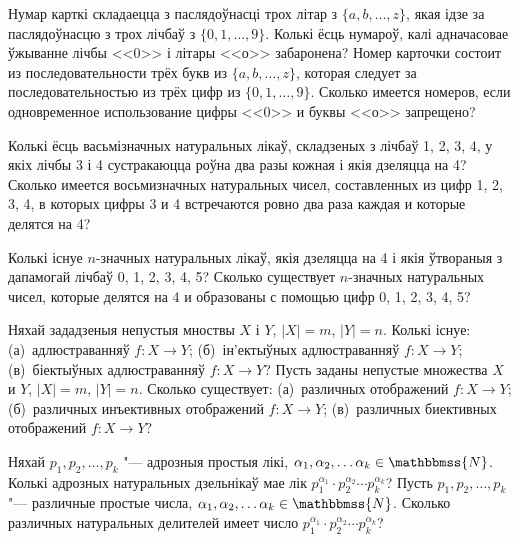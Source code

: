 \begin{problemList}
\bigskip

\problemItemSimple
{Нумар карткі складаецца з паслядоўнасці трох літар з  $\{a, b, \dots, z \}$, якая ідзе за паслядоўнасцю з трох лічбаў з $\{0, 1, \dots, 9 \}$. Колькі ёсць нумароў, калі адначасовае ўжыванне лічбы <<0>> і літары <<о>> забаронена?}
{Номер карточки состоит из последовательности трёх букв из $\{a, b, \dots, z \}$, которая следует за последовательностью из трёх цифр из $\{0, 1, \dots, 9 \}$. Сколько имеется номеров, если одновременное использование цифры <<0>> и буквы <<о>> запрещено?}

\bigskip

\problemItemSimple
{Колькі ёсць васьмізначных натуральных лікаў, складзеных з лічбаў 1, 2, 3, 4, у якіх лічбы 3 і 4 сустракаюцца роўна два разы кожная і якія дзеляцца на 4?}
{Сколько имеется восьмизначных натуральных чисел, составленных из цифр 1, 2, 3, 4, в которых цифры 3 и 4 встречаются ровно два раза каждая и которые делятся на 4?}

\bigskip

\problemItemSimple
{Колькі існуе $n$-значных натуральных лікаў, якія дзеляцца на 4 і якія ўтвораныя з дапамогай лічбаў 0, 1, 2, 3, 4, 5?}
{Сколько существует $n$-значных натуральных чисел, которые делятся на 4 и образованы с помощью цифр 0, 1, 2, 3, 4, 5?}

\bigskip

\problemItemSimple
{Няхай зададзеныя непустыя мноствы $X$ і $Y$, $|X|=m$, $|Y|=n$. Колькі існуе: (а)~адлюстраванняў $f : X \rightarrow Y$; (б)~ін'ектыўных адлюстраванняў $f : X \rightarrow Y$; (в)~біектыўных адлюстраванняў $f : X \rightarrow Y$?}
{Пусть заданы непустые множества $X$ и $Y$, $|X|=m$, $|Y|=n$. Сколько существует: (а)~различных отображений $f : X \rightarrow Y$; (б)~различных инъективных отображений $f : X \rightarrow Y$; (в)~различных биективных отображений $f : X \rightarrow Y$?}

\bigskip

\problemItemSimple
{Няхай $p_{1}, p_{2}, \dots, p_{k}$ "--- адрозныя простыя лікі, $\alpha_{1}, \alpha_{2}, \dots \alpha_{k} \in \mathbbmss{N}$. Колькі адрозных натуральных дзельнікаў мае лік $p_{1} ^{\alpha_{1}} \cdot p_{2} ^{\alpha_{2}} \cdots p_{k} ^{\alpha_{k}}$?}
{Пусть $p_{1}, p_{2}, \dots, p_{k}$ "--- различные простые числа, $\alpha_{1}, \alpha_{2}, \dots \alpha_{k} \in \mathbbmss{N}$. Сколько различных натуральных делителей имеет число $p_{1} ^{\alpha_{1}} \cdot p_{2} ^{\alpha_{2}} \cdots p_{k} ^{\alpha_{k}}$?}

\bigskip


\end{problemList}
